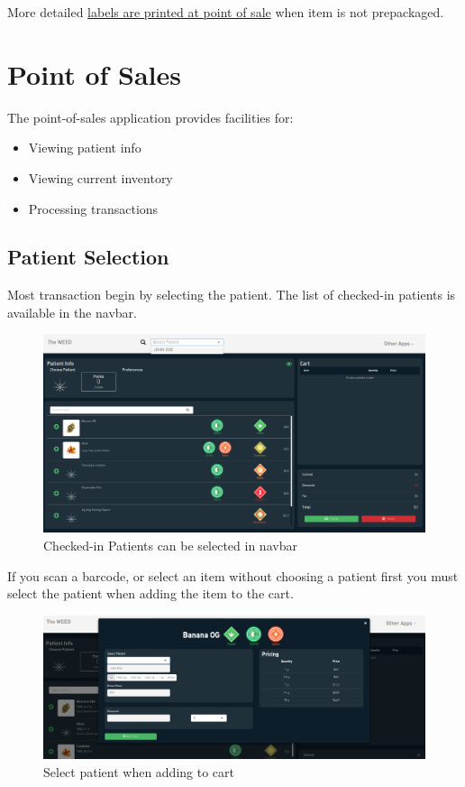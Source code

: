 \documentclass[]{book}
\theoremstyle{definition}
\theoremstyle{definition}
\theoremstyle{definition}
\theoremstyle{remark}
\begin{document}
More detailed \href{point-of-sales.html\#labels-1}{labels are printed at
point of sale} when item is not prepackaged.

\chapter{Point of Sales}\label{point-of-sales}

The point-of-sales application provides facilities for:

\begin{itemize}
\item
  Viewing patient info
\item
  Viewing current inventory
\item
  Processing transactions
\end{itemize}

\section{Patient Selection}\label{patient-selection}

Most transaction begin by selecting the patient. The list of checked-in
patients is available in the navbar.

\begin{figure}
\centering
\includegraphics{images/P1.png}
\caption{Checked-in Patients can be selected in navbar}
\end{figure}

If you scan a barcode, or select an item without choosing a patient
first you must select the patient when adding the item to the cart.

\begin{figure}
\centering
\includegraphics{images/cart1.png}
\caption{Select patient when adding to cart}
\end{figure}
\end{document}
